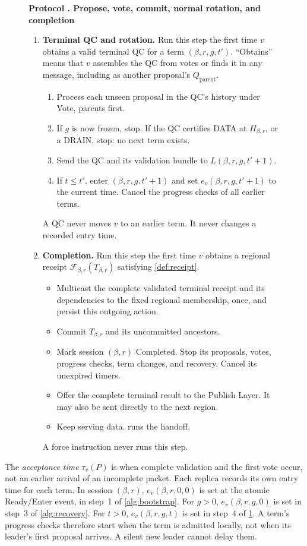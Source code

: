 \documentclass[11pt,a4paper]{article}
\newcommand{\RR}[1]{{\color{rrRed}#1}}
\newcommand{\FC}{\mathcal F}
\newcommand{\defterm}[1]{\textcolor{rrBlue}{\textit{#1}}}
\newcounter{protocol}
\newenvironment{protocol}[3][htbp]{\begin{figure}[#1]\refstepcounter{protocol}\label{#2}
\begin{mdframed}[linewidth=.6pt,skipabove=0pt,skipbelow=0pt,
innertopmargin=7pt,innerbottommargin=7pt]\small
\textbf{Protocol \theprotocol. #3}\par\smallskip}{\end{mdframed}\end{figure}}
\begin{document}
\begin{protocol}{alg:steady}{Propose, vote, commit, normal rotation\RR{, and completion}}
\begin{enumerate}[label=\textbf{\arabic*)},itemsep=3pt]
\item \textbf{Terminal QC and rotation.} Run this step the first time
$v$ obtains a valid terminal QC for a term $(\beta,r,g,t')$.
``Obtains'' means that $v$ assembles the QC from votes or finds it in
any message, including as another proposal's $Q_{\mathrm{parent}}$.
 \begin{enumerate}[label=(\alph*)]
 \item Process each unseen proposal in the QC's history under Vote,
       parents first.
 \item If $g$ is now frozen, stop. \RR{If the QC certifies DATA at
       $H_{\beta,r}$, or a DRAIN, stop: no next term exists.}
 \item Send the QC and its validation bundle to $L(\beta,r,g,t'+1)$.
 \item If $t\le t'$, enter $(\beta,r,g,t'+1)$ and set $e_v(\beta,r,g,t'+1)$ to the
       current time. Cancel the progress checks of all earlier
       terms.
 \end{enumerate}
 A QC never moves $v$ to an earlier term. It never changes a recorded
 entry time.

\item \RR{\textbf{Completion.} Run this step the first time $v$ obtains a
regional receipt $\FC_{\beta,r}(T_{\beta,r})$ satisfying \cref{def:receipt}.}
 \begin{itemize}\color{rrRed}
 \item Multicast the complete validated terminal receipt and its dependencies
       to the fixed regional membership, once, and persist this outgoing action.
 \item Commit $T_{\beta,r}$ and its uncommitted ancestors.
 \item Mark session $(\beta,r)$ Completed. Stop its proposals, votes, progress
       checks, term changes, and recovery. Cancel its unexpired timers.
 \item Offer the complete terminal result to the Publish Layer.
       It may also be sent directly to the next region.
 \item Keep serving data.  runs the handoff.
 \end{itemize}
 \RR{A force instruction never runs this step.}
\end{enumerate}
\end{protocol}

The \defterm{acceptance time} $\tau_v(P)$ is when complete validation and the first
vote occur, not an earlier arrival of an incomplete packet. Each replica
records its own entry time for each term. In session $(\beta,r)$, $e_v(\beta,r,0,0)$ is
set at the atomic Ready/Enter event, in step~1 of \cref{alg:bootstrap}. For $g>0$, $e_v(\beta,r,g,0)$ is
set in step~3 of \cref{alg:recovery}. For $t>0$, $e_v(\beta,r,g,t)$ is set in
step~4 of \cref{alg:steady}. A term's progress checks therefore start
when the term is admitted locally, not when its leader's first proposal
arrives. A silent new leader cannot delay them.
\end{document}
